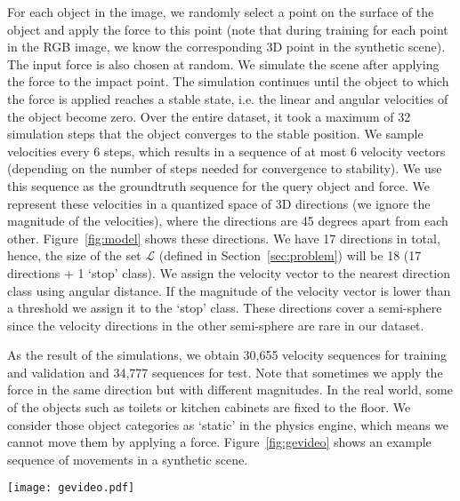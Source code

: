 \documentclass[runningheads]{llncs}
\begin{document}
For each object in the image, we randomly select a point on the surface of the object and apply the force to this point (note that during training for each point in the RGB image, we know the corresponding 3D point in the synthetic scene). The input force is also chosen at random. We simulate the scene after applying the force to the impact point. The simulation continues until the object to which the force is applied reaches a stable state, i.e. the linear and angular velocities of the object become zero. Over the entire dataset, it took a maximum of 32 simulation steps that the object converges to the stable position. We sample velocities every 6 steps, which results in a sequence of at most 6 velocity vectors (depending on the number of steps needed for convergence to stability). We use this sequence as the groundtruth sequence for the query object and force. We represent these velocities in a quantized space of 3D directions (we ignore the magnitude of the velocities), where the directions are 45 degrees apart from each other. Figure~\ref{fig:model} shows these directions. We have 17 directions in total, hence, the size of the set $\mathcal{L}$ (defined in Section~\ref{sec:problem}) will be 18 (17 directions + 1 `stop' class). We assign the velocity vector to the nearest direction class using angular distance. If the magnitude of the velocity vector is lower than a threshold we assign it to the `stop' class. These directions cover a semi-sphere since the velocity directions in the other semi-sphere are rare in our dataset.

As the result of the simulations, we obtain 30,655 velocity sequences for training and validation and 34,777 sequences for test. Note that sometimes we apply the force in the same direction but with different magnitudes. In the real world, some of the objects such as toilets or kitchen cabinets are fixed to the floor. We consider those object categories as `static' in the physics engine, which means we cannot move them by applying a force. Figure~\ref{fig:gevideo} shows an example sequence of movements in a synthetic scene. 

\begin{figure*}[t]
\centering
  \texttt{[image: gevideo.pdf]}
\caption{\textbf{Synthesizing the effect of the force.} A force (shown by a yellow arrow) is applied to a point on the surface of the chair. The three pictures on the right show different time steps of the scene simulated in the physics engine. There is a red circle around the object that moves.}%
\label{fig:gevideo}
\end{figure*}
\end{document}
